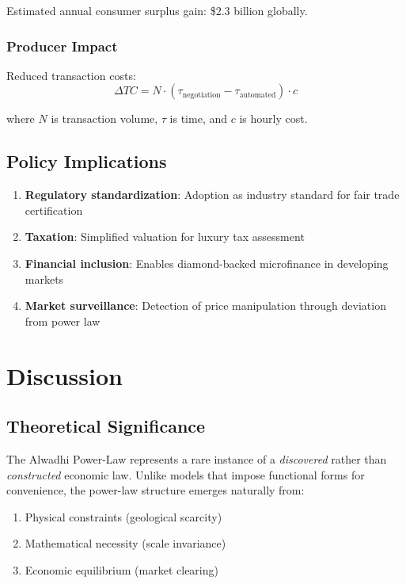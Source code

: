 \documentclass[12pt,a4paper]{article}
\theoremstyle{definition}
\theoremstyle{remark}
\begin{document}
Estimated annual consumer surplus gain: \$2.3 billion globally.

\subsubsection{Producer Impact}

Reduced transaction costs:
\begin{equation}
\Delta TC = N \cdot (\tau_{\text{negotiation}} - \tau_{\text{automated}}) \cdot c
\end{equation}

where $N$ is transaction volume, $\tau$ is time, and $c$ is hourly cost.

\subsection{Policy Implications}

\begin{enumerate}
\item \textbf{Regulatory standardization}: Adoption as industry standard for fair trade certification
\item \textbf{Taxation}: Simplified valuation for luxury tax assessment
\item \textbf{Financial inclusion}: Enables diamond-backed microfinance in developing markets
\item \textbf{Market surveillance}: Detection of price manipulation through deviation from power law
\end{enumerate}

\section{Discussion}

\subsection{Theoretical Significance}

The Alwadhi Power-Law represents a rare instance of a \textit{discovered} rather than \textit{constructed} economic law. Unlike models that impose functional forms for convenience, the power-law structure emerges naturally from:

\begin{enumerate}
\item Physical constraints (geological scarcity)
\item Mathematical necessity (scale invariance)
\item Economic equilibrium (market clearing)
\end{enumerate}
\end{document}
